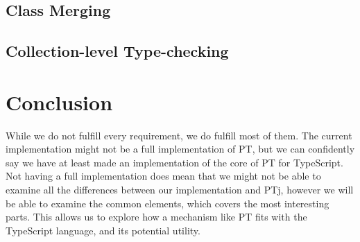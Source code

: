 \subsection{Class Merging}

\subsection{Collection-level Type-checking}\label{subsec:implementation-collection-level-type-checking}

\section{Conclusion}\label{sec:requirements-conclusion}

While we do not fulfill every requirement, we do fulfill most of them.
The current implementation might not be a full implementation of PT, but we can confidently say we have at least made an implementation of the core of PT for TypeScript.
Not having a full implementation does mean that we might not be able to examine all the differences between our implementation and PTj, however we will be able to examine the common elements, which covers the most interesting parts.
This allows us to explore how a mechanism like PT fits with the TypeScript language, and its potential utility.